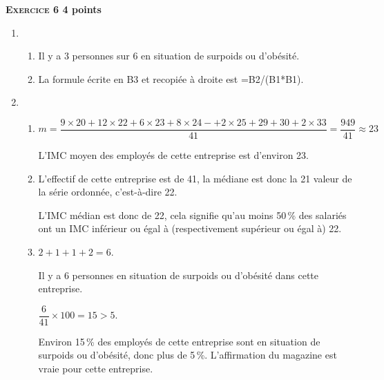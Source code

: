 \textbf{\textsc{Exercice 6} \hfill 4 points}

\medskip
\begin{enumerate}
\item 
	\begin{enumerate}
		\item Il y a 3 personnes sur 6 en situation de surpoids ou d'obésité.
		\item La formule écrite en B3 et recopiée à droite est =B2/(B1*B1).
	\end{enumerate}
\item 
	\begin{enumerate}
		\item $m = \dfrac{9 \times 20 + 12 \times 22 + 6\times 23 +8 \times 24- + 2\times 25 + 29 + 30 + 2 \times 33}{41} = \dfrac{949}{41} \approx  23$
		
L'IMC moyen des employés de cette entreprise est d'environ 23.
		\item L'effectif de cette entreprise est de 41, la médiane est donc la 21 valeur de la série ordonnée, c'est-à-dire 22. 
		
L'IMC médian est donc de 22, cela signifie qu'au moins 50\,\% des salariés ont un IMC inférieur ou égal à (respectivement supérieur ou égal à) 22.
		\item $2 + 1 + 1 + 2 = 6$.

Il y a 6 personnes en situation de surpoids ou d'obésité dans cette entreprise.

$\dfrac{6}{41} \times  100 = 15 > 5$.

Environ 15\,\% des employés de cette entreprise sont en situation de surpoids ou
d'obésité, donc plus de 5\,\%. L'affirmation du magazine est vraie pour cette
entreprise.
	\end{enumerate}
\end{enumerate}

\bigskip

